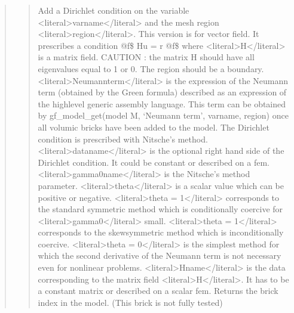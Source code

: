 \documentclass[a4paper,11pt,english]{sphinxmanual}
\begin{document}
\begin{quote}
\begin{quote}
\sphinxAtStartPar
Add a Dirichlet condition on the variable \textless{}literal\textgreater{}varname\textless{}/literal\textgreater{} and the mesh
region \textless{}literal\textgreater{}region\textless{}/literal\textgreater{}.
This version is for vector field. It prescribes a condition
@f\$ Hu = r @f\$ where \textless{}literal\textgreater{}H\textless{}/literal\textgreater{} is a matrix field.
CAUTION : the matrix H should have all eigenvalues equal to 1 or 0.
The region should be a boundary.   \textless{}literal\textgreater{}Neumannterm\textless{}/literal\textgreater{}
is the expression of the Neumann term (obtained by the Green formula)
described as an expression of the high\sphinxhyphen{}level
generic assembly language. This term can be obtained by
gf\_model\_get(model M, ‘Neumann term’, varname, region) once all volumic bricks have
been added to the model.  The Dirichlet
condition is prescribed with Nitsche’s method. \textless{}literal\textgreater{}dataname\textless{}/literal\textgreater{} is the optional
right hand side of the Dirichlet condition. It could be constant or
described on a fem. \textless{}literal\textgreater{}gamma0name\textless{}/literal\textgreater{} is the
Nitsche’s method parameter. \textless{}literal\textgreater{}theta\textless{}/literal\textgreater{} is a scalar value which can be
positive or negative. \textless{}literal\textgreater{}theta = 1\textless{}/literal\textgreater{} corresponds to the standard symmetric
method which is conditionally coercive for  \textless{}literal\textgreater{}gamma0\textless{}/literal\textgreater{} small.
\textless{}literal\textgreater{}theta = \sphinxhyphen{}1\textless{}/literal\textgreater{} corresponds to the skew\sphinxhyphen{}symmetric method which is
inconditionally coercive. \textless{}literal\textgreater{}theta = 0\textless{}/literal\textgreater{} is the simplest method
for which the second derivative of the Neumann term is not necessary
even for nonlinear problems. \textless{}literal\textgreater{}Hname\textless{}/literal\textgreater{} is the data
corresponding to the matrix field \textless{}literal\textgreater{}H\textless{}/literal\textgreater{}. It has to be a constant matrix
or described on a scalar fem. Returns the brick index in the model.
(This brick is not fully tested)
\end{quote}

\sphinxAtStartPar
{}
\begin{quote}


\end{quote}
\end{quote}
\end{document}

